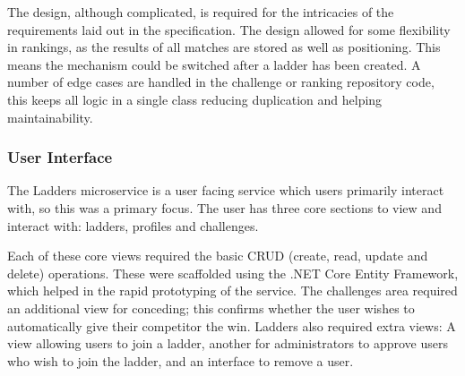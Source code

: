 \par
The design, although complicated, is required for the intricacies of the requirements laid out in the specification. The design allowed for some flexibility in rankings, as the results of all matches are stored as well as positioning. This means the mechanism could be switched after a ladder has been created. A number of edge cases are handled in the challenge or ranking repository code, this keeps all logic in a single class reducing duplication and helping maintainability.

\subsubsection{User Interface}
\par
The Ladders microservice is a user facing service which users primarily interact with, so this was a primary focus. The user has three core sections to view and interact with: ladders, profiles and challenges.

\par
Each of these core views required the basic CRUD (create, read, update and delete) operations. These were scaffolded using the .NET Core Entity Framework, which helped in the rapid prototyping of the service. The challenges area required an additional view for conceding; this confirms whether the user wishes to automatically give their competitor the win. Ladders also required extra views: A view allowing users to join a ladder, another for administrators to approve users who wish to join the ladder, and an interface to remove a user.
